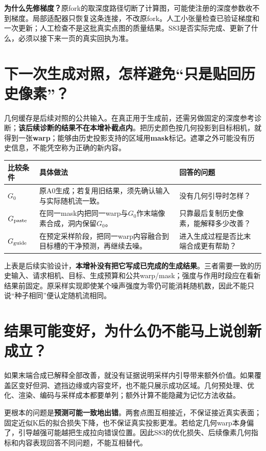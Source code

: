 \documentclass[UTF8,11pt,a4paper]{ctexart}
\begin{document}
\textbf{为什么先修梯度？}原fork的取深度路径切断了计算图，可能使注册的深度参数收不到梯度。局部适配器只恢复这条连接，不改原fork。人工小张量检查已验证梯度和一次更新；人工检查不是这批真实点图的质量结果。S83是否实际完成、更新了什么，必须以接下来一页的真实回执为准。
\clearpage



\clearpage
\section{ 下一次生成对照，怎样避免“只是贴回历史像素”？}
几何缓存是后续对照的公共输入。在真正用于生成前，还需另做固定的深度参考诊断；\textbf{该后续诊断的结果不在本增补截点内}。把历史颜色按几何投影到目标相机，就得到一张\textbf{warp}；能够由历史投影支持的区域用\textbf{mask}标记。遮罩之外可能没有历史信息，不能凭空称为正确的新内容。

\begin{center}\small
\begin{tabular}{p{2.1cm}p{7.2cm}p{5.7cm}}\toprule
比较条件&具体做法&回答的问题\\\midrule
$G_0$&原A0生成；若复用旧结果，须先确认输入与实际随机流一致。&没有几何引导时怎样？\\
$G_{\rm paste}$&在同一mask内把同一warp与$G_0$作末端像素合成，洞内保留$G_0$。&只靠最后复制历史像素，能解释多少改善？\\
$G_{\rm guide}$&在预定采样阶段，把同一warp内容融合到目标槽的干净预测，再继续去噪。&进入生成过程是否比末端合成更有帮助？\\\bottomrule
\end{tabular}\end{center}

上表是后续实验设计，\textbf{本增补没有把它写成已完成的生成结果}。三者需要一致的历史输入、请求相机、目标、生成预算和公共warp/mask；强度与作用时段应在看新结果前固定。原采样实现即使某个噪声强度为零仍可能消耗随机数，因此不能只说“种子相同”便认定随机流相同。

\section{ 结果可能变好，为什么仍不能马上说创新成立？}
如果末端合成已解释全部改善，就没有证据说明采样内引导带来额外价值。如果覆盖区变好但洞、遮挡边缘或内容变坏，也不能只展示成功区域。几何预处理、优化、渲染、编码与采样成本都要单列；额外计算不能隐藏为记忆方法收益。

更根本的问题是\textbf{预测可能一致地出错}。两套点图互相接近，不保证接近真实表面；固定近似K后的拟合损失下降，也不保证真实投影更准。若给定几何warp本身偏了，引导越强可能越把生成拉向错误位置。因此S83的优化损失、后续像素几何指标和内容表现回答不同问题，不能互相替代。
\end{document}
